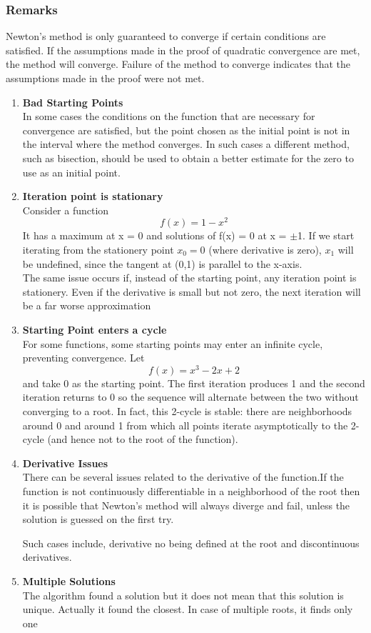 \documentclass[11pt]{article}
\begin{document}
\subsubsection{Remarks}
Newton's method is only guaranteed to converge if certain conditions are satisfied. If the assumptions made in the proof of quadratic convergence are met, the method will converge. Failure of the method to converge indicates that the assumptions made in the proof were not met. 
\begin{enumerate}
	\item \textbf {Bad Starting Points}\\
	In some cases the conditions on the function that are necessary for convergence are satisfied, but the point chosen as the initial point is not in the interval where the method converges. In such cases a different method, such as bisection, should be used to obtain a better estimate for the zero to use as an initial point.
	
	\item \textbf{Iteration point is stationary}\\
	Consider a function \[ f(x) = 1 - x^2\]
	It has a maximum at x = 0 and solutions of f(x) = 0 at x = $\pm$1. If we start iterating from the stationery point $x_0 = 0$ (where derivative is zero), $x_1$ will be undefined, since the tangent at (0,1) is parallel to the x-axis.\\
	
	The same issue occurs if, instead of the starting point, any iteration point is stationery. Even if the derivative is small but not zero, the next iteration will be a far worse approximation
	
	\item \textbf{Starting Point enters a cycle}\\
	For some functions, some starting points may enter an infinite cycle, preventing convergence. Let  \[ f(x) = x^3 -2x + 2\]
	and take 0 as the starting point. The first iteration produces 1 and the second iteration returns to 0 so the sequence will alternate between the two without converging to a root. In fact, this 2-cycle is stable: there are neighborhoods around 0 and around 1 from which all points iterate asymptotically to the 2-cycle (and hence not to the root of the function).
	\item \textbf{Derivative Issues}\\
	There can be several issues related to the derivative of the function.If the function is not continuously differentiable in a neighborhood of the root then it is possible that Newton's method will always diverge and fail, unless the solution is guessed on the first try.
	
	Such cases include, derivative no being defined at the root and discontinuous derivatives.
	\item \textbf{Multiple Solutions}\\
	The algorithm found a solution but it does not mean that this solution is unique. Actually it found the closest. In case of multiple roots, it finds only one
\end{enumerate}
\pagebreak
\end{document}
